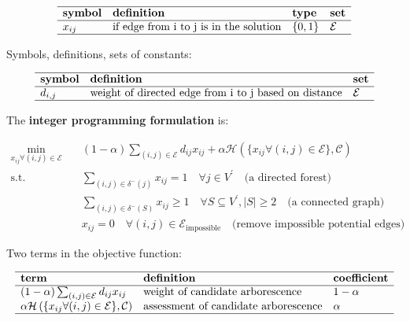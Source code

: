 \documentclass[
]{book}
\begin{document}
\[
\begin{array}{llll}
  \hline
  \textbf{symbol} & \textbf{definition} & \textbf{type} & \textbf{set} \\
  \hline
  x_{i j} & \text{if edge from i to j is in the solution}
  & \{0, 1\} & \mathcal{E} \\
  \hline
\end{array}
\]

Symbols, definitions, sets of constants:

\[
\begin{array}{lll}
  \hline
  \textbf{symbol} & \textbf{definition} & \textbf{set} \\
  \hline
  d_{i, j} & \text{weight of directed edge from i to j based on distance}
  & \mathcal{E} \\
  \hline
\end{array}
\]

The \textbf{integer programming formulation} is:

\[
\begin{aligned}
  \min_{x_{i j} \forall (i, j) \in \mathcal{E}} \quad
    & (1 - \alpha) \sum_{(i, j) \in \mathcal{E}} d_{i j} x_{i j}
    + \alpha \mathcal{H}
    \left(\{x_{i j} \forall (i, j) \in \mathcal{E} \}, \mathcal{C} \right) \\
  \text{s.t.} \quad & \sum_{(i, j) \in \delta^{-}(j)} x_{i j} = 1
    \quad \forall j \in V^{\prime}
    \quad \text{(a directed forest)} \\
  & \sum_{(i, j) \in \delta^{-}(S)} x_{i j} \geq 1
    \quad \forall S \subseteq V^{\prime},|S| \geq 2
    \quad \text{(a connected graph)} \\
  & x_{i j} = 0
    \quad \forall (i, j) \in \mathcal{E}_\text{impossible}
    \quad \text{(remove impossible potential edges)}
\end{aligned}
\]

Two terms in the objective function:

\[
\begin{array}{lll}
  \hline
  \textbf{term} & \textbf{definition} & \textbf{coefficient} \\
  \hline
  (1 - \alpha) \sum_{(i, j) \in \mathcal{E}} d_{i j} x_{i j}
  & \text{weight of candidate arborescence}
  & 1 - \alpha \\
  \alpha \mathcal{H}
  \left(\{x_{i j} \forall (i, j) \in \mathcal{E} \}, \mathcal{C} \right)
  & \text{assessment of candidate arborescence}
  & \alpha \\
  \hline
\end{array}
\]
\end{document}

